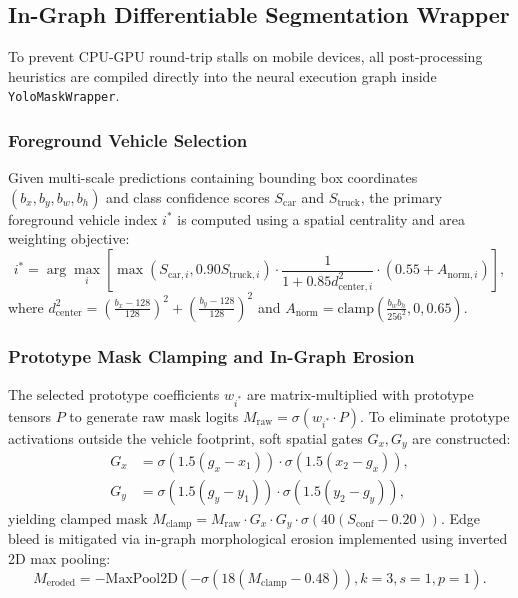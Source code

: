 \documentclass[10pt,journal,compsoc]{IEEEtran}
\begin{document}
\subsection{In-Graph Differentiable Segmentation Wrapper}
To prevent CPU-GPU round-trip stalls on mobile devices, all post-processing heuristics are compiled directly into the neural execution graph inside \texttt{YoloMaskWrapper}.

\subsubsection{Foreground Vehicle Selection}
Given multi-scale predictions containing bounding box coordinates $(b_x, b_y, b_w, b_h)$ and class confidence scores $S_{\text{car}}$ and $S_{\text{truck}}$, the primary foreground vehicle index $i^*$ is computed using a spatial centrality and area weighting objective:
\begin{equation}
    i^* = \arg\max_{i} \left[ \max(S_{\text{car}, i}, 0.90 S_{\text{truck}, i}) \cdot \frac{1}{1 + 0.85 d_{\text{center}, i}^2} \cdot (0.55 + A_{\text{norm}, i}) \right],
\end{equation}
where $d_{\text{center}}^2 = \left(\frac{b_x - 128}{128}\right)^2 + \left(\frac{b_y - 128}{128}\right)^2$ and $A_{\text{norm}} = \text{clamp}\left(\frac{b_w b_h}{256^2}, 0, 0.65\right)$.

\subsubsection{Prototype Mask Clamping and In-Graph Erosion}
The selected prototype coefficients $w_{i^*}$ are matrix-multiplied with prototype tensors $P$ to generate raw mask logits $M_{\text{raw}} = \sigma(w_{i^*} \cdot P)$. To eliminate prototype activations outside the vehicle footprint, soft spatial gates $G_x, G_y$ are constructed:
\begin{align}
    G_x &= \sigma(1.5(g_x - x_1)) \cdot \sigma(1.5(x_2 - g_x)), \\
    G_y &= \sigma(1.5(g_y - y_1)) \cdot \sigma(1.5(y_2 - g_y)),
\end{align}
yielding clamped mask $M_{\text{clamp}} = M_{\text{raw}} \cdot G_x \cdot G_y \cdot \sigma(40(S_{\text{conf}} - 0.20))$. Edge bleed is mitigated via in-graph morphological erosion implemented using inverted 2D max pooling:
\begin{equation}
    M_{\text{eroded}} = - \text{MaxPool2D}(- \sigma(18(M_{\text{clamp}} - 0.48)), k=3, s=1, p=1).
\end{equation}
\end{document}
